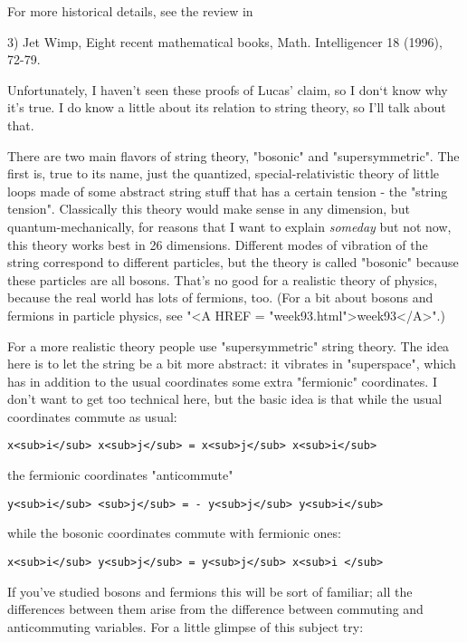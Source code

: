 For more historical details, see the review in 

3) Jet Wimp, Eight recent mathematical books, Math. Intelligencer
18 (1996), 72-79.

Unfortunately, I haven't seen these proofs of Lucas' claim, so I don`t
know why it's true.  I do know a little about its relation to 
string theory, so I'll talk about that.  

There are two main flavors of string theory, "bosonic" and
"supersymmetric".  The first is, true to its name, just the quantized,
special-relativistic theory of little loops made of some abstract 
string stuff that has a certain tension - the "string tension".  
Classically this theory would make sense in any dimension, but 
quantum-mechanically, for reasons that I want to explain \emph{someday} 
but not now, this theory works best in 26 dimensions.   Different 
modes of vibration of the string correspond to different particles, 
but the theory is called "bosonic" because these particles are all 
bosons.  That's no good for a realistic theory of physics, because
the real world has lots of fermions, too.  (For a bit about 
bosons and fermions in particle physics, see "<A HREF = "week93.html">week93</A>".)  

For a more realistic theory people use "supersymmetric" string
theory.  The idea here is to let the string be a bit more abstract:
it vibrates in "superspace", which has in addition to the usual
coordinates some extra "fermionic" coordinates.  I don't want to
get too technical here, but the basic idea is that while the usual
coordinates commute as usual:

\begin{verbatim}
x<sub>i</sub> x<sub>j</sub> = x<sub>j</sub> x<sub>i</sub>
\end{verbatim}
    
the fermionic coordinates "anticommute"

\begin{verbatim}
y<sub>i</sub> <sub>j</sub> = - y<sub>j</sub> y<sub>i</sub>
\end{verbatim}
    
while the bosonic coordinates commute with fermionic ones:

\begin{verbatim}
x<sub>i</sub> y<sub>j</sub> = y<sub>j</sub> x<sub>i </sub>
\end{verbatim}
    
If you've studied bosons and fermions this will be sort of
familiar; all the differences between them arise from the difference 
between commuting and anticommuting variables.  For a little glimpse
of this subject try:

